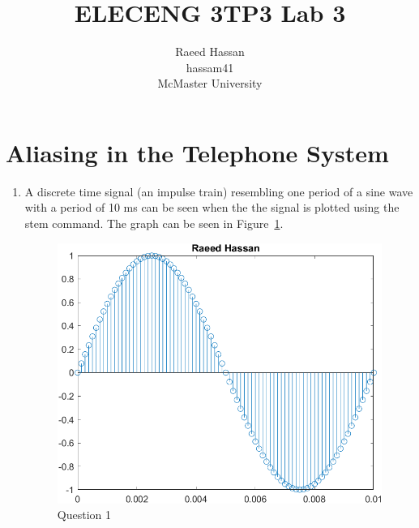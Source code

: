\documentclass[12pt]{article}
\title{ELECENG 3TP3 Lab 3}
\author{Raeed Hassan \\ hassam41 \\ McMaster University}
\begin{document}
\maketitle
\pagebreak
\section*{Aliasing in the Telephone System}
\begin{enumerate}
    \item
    A discrete time signal (an impulse train) resembling one period of a sine wave with a period of 10 ms can be seen when the the signal is plotted using the stem command. The graph can be seen in Figure~\ref{fig:tele_question1}.
    \begin{figure}[!ht]
        \centering
        \includegraphics[width=\textwidth]{tele_question1}
        \caption{\label{fig:tele_question1}Question 1}
    \end{figure}
    

\end{enumerate}
\end{document}
